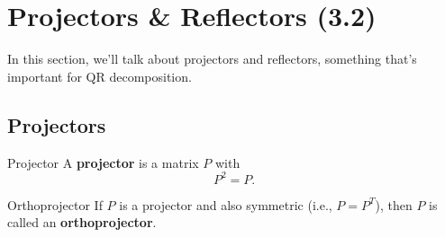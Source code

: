 \documentclass[letterpaper]{article}
\newcommand{\0}{\mathbf{0}}
\begin{document}
\section{Projectors \& Reflectors (3.2)}
In this section, we'll talk about projectors and reflectors, something that's important for QR decomposition.

\subsection{Projectors}
\begin{definition}{Projector}{}
    A \textbf{projector} is a matrix $P$ with \[P^2 = P.\] 
\end{definition}

\begin{definition}{Orthoprojector}{}
    If $P$ is a projector and also symmetric (i.e., $P = P^T$), then $P$ is called an \textbf{orthoprojector}.
\end{definition}
\end{document}
